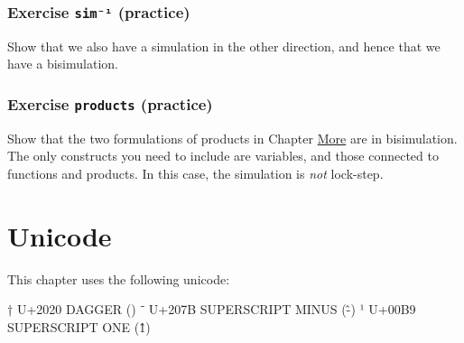\hypertarget{exercise-simuxb9-practice}{%
\subsubsection{\texorpdfstring{Exercise \texttt{sim⁻¹}
(practice)}{Exercise sim⁻¹ (practice)}}\label{exercise-simuxb9-practice}}

Show that we also have a simulation in the other direction, and hence
that we have a bisimulation.

\begin{fence}
\begin{code}%
\>[0]\<%
\end{code}
\end{fence}

\hypertarget{exercise-products-practice}{%
\subsubsection{\texorpdfstring{Exercise \texttt{products}
(practice)}{Exercise products (practice)}}\label{exercise-products-practice}}

Show that the two formulations of products in Chapter
\protect\hyperlink{More}{More} are in bisimulation. The only constructs
you need to include are variables, and those connected to functions and
products. In this case, the simulation is \emph{not} lock-step.

\begin{fence}
\begin{code}%
\>[0]\<%
\end{code}
\end{fence}

\hypertarget{unicode}{%
\section{Unicode}\label{unicode}}

This chapter uses the following unicode:

\begin{myDisplay}
†  U+2020  DAGGER (\dag)
⁻  U+207B  SUPERSCRIPT MINUS (\^-)
¹  U+00B9  SUPERSCRIPT ONE (\^1)
\end{myDisplay}

